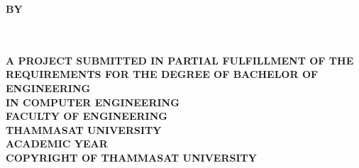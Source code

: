 \pagestyle{empty}
\begin{center}
	\vspace*{40mm}
	\begin{spacing}{1.4}
		\textbf{\huge\titleEng}
	\end{spacing}
	\vspace*{35mm}
	\textbf{BY}\\
	\vspace*{10mm}
	\textbf{\authorAEngNew}\\
	\textbf{\authorBEngNew}\\
	\vfill
	\begin{spacing}{1.3}
		\textbf{A PROJECT SUBMITTED IN PARTIAL FULFILLMENT OF THE\\
			REQUIREMENTS FOR THE DEGREE OF BACHELOR OF ENGINEERING\\
			IN COMPUTER ENGINEERING\\
			FACULTY OF ENGINEERING\\ THAMMASAT UNIVERSITY\\
			ACADEMIC YEAR \academicYearEng\\ COPYRIGHT OF THAMMASAT UNIVERSITY}
	\end{spacing}
\end{center}
